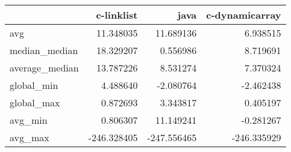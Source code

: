 \begin{tabular}{lrrr}
\toprule
{} &  c-linklist &        java &  c-dynamicarray \\
\midrule
avg            &   11.348035 &   11.689136 &        6.938515 \\
median\_median  &   18.329207 &    0.556986 &        8.719691 \\
average\_median &   13.787226 &    8.531274 &        7.370324 \\
global\_min     &    4.488640 &   -2.080764 &       -2.462438 \\
global\_max     &    0.872693 &    3.343817 &        0.405197 \\
avg\_min        &    0.806307 &   11.149241 &       -0.281267 \\
avg\_max        & -246.328405 & -247.556465 &     -246.335929 \\
\bottomrule
\end{tabular}
